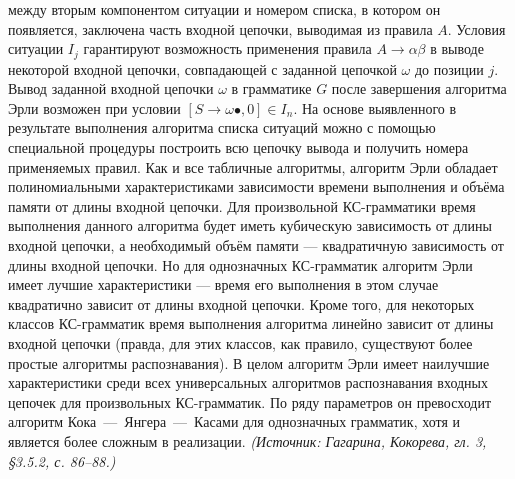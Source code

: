 \documentclass[a4paper,12pt]{article}
\begin{document}
между вторым компонентом ситуации и номером списка, в котором он появляется, заключена часть входной цепочки, выводимая из правила \(A\). Условия ситуации \(I_j\) гарантируют возможность применения правила \(A\to\alpha\beta\) в выводе некоторой входной цепочки, совпадающей с заданной цепочкой \(\omega\) до позиции \(j\). Вывод заданной входной цепочки \(\omega\) в грамматике \(G\) после завершения алгоритма Эрли возможен при условии \([S\to\omega\bullet,0]\in I_n\). На основе выявленного в результате выполнения алгоритма списка ситуаций можно с помощью специальной процедуры построить всю цепочку вывода и получить номера применяемых правил. Как и все табличные алгоритмы, алгоритм Эрли обладает полиномиальными характеристиками зависимости времени выполнения и объёма памяти от длины входной цепочки. Для произвольной КС-грамматики время выполнения данного алгоритма будет иметь кубическую зависимость от длины входной цепочки, а необходимый объём памяти — квадратичную зависимость от длины входной цепочки. Но для однозначных КС-грамматик алгоритм Эрли имеет лучшие характеристики — время его выполнения в этом случае квадратично зависит от длины входной цепочки. Кроме того, для некоторых классов КС-грамматик время выполнения алгоритма линейно зависит от длины входной цепочки (правда, для этих классов, как правило, существуют более простые алгоритмы распознавания). В целом алгоритм Эрли имеет наилучшие характеристики среди всех универсальных алгоритмов распознавания входных цепочек для произвольных КС-грамматик. По ряду параметров он превосходит алгоритм Кока~—~Янгера~—~Касами для однозначных грамматик, хотя и является более сложным в реализации.
\textit{(Источник: Гагарина, Кокорева, гл. 3, §3.5.2, с. 86--88.)}
\end{document}
